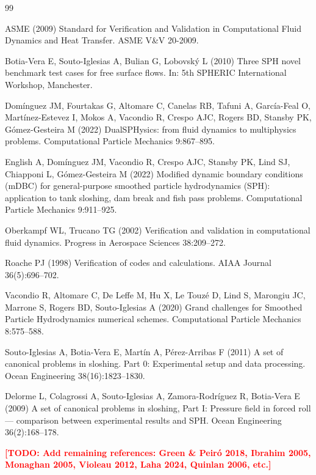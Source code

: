 \documentclass[twocolumn]{svjour3}
\newcommand{\TODO}[1]{\textcolor{red}{\textbf{[TODO: #1]}}}
\begin{document}
\begin{thebibliography}{99}

ASME (2009)
Standard for Verification and Validation in Computational Fluid Dynamics
and Heat Transfer.
ASME V\&V 20-2009.

Botia-Vera E, Souto-Iglesias A, Bulian G, Lobovsk\'y L (2010)
Three SPH novel benchmark test cases for free surface flows.
In: 5th SPHERIC International Workshop, Manchester.

Dom\'inguez JM, Fourtakas G, Altomare C, Canelas RB, Tafuni A, Garc\'ia-Feal O,
Mart\'inez-Estevez I, Mokos A, Vacondio R, Crespo AJC, Rogers BD,
Stansby PK, G\'omez-Gesteira M (2022)
DualSPHysics: from fluid dynamics to multiphysics problems.
Computational Particle Mechanics 9:867--895.

English A, Dom\'inguez JM, Vacondio R, Crespo AJC, Stansby PK, Lind SJ,
Chiapponi L, G\'omez-Gesteira M (2022)
Modified dynamic boundary conditions (mDBC) for general-purpose smoothed
particle hydrodynamics (SPH): application to tank sloshing, dam break
and fish pass problems.
Computational Particle Mechanics 9:911--925.

Oberkampf WL, Trucano TG (2002)
Verification and validation in computational fluid dynamics.
Progress in Aerospace Sciences 38:209--272.

Roache PJ (1998)
Verification of codes and calculations.
AIAA Journal 36(5):696--702.

Vacondio R, Altomare C, De Leffe M, Hu X, Le Touz\'e D, Lind S,
Marongiu JC, Marrone S, Rogers BD, Souto-Iglesias A (2020)
Grand challenges for Smoothed Particle Hydrodynamics numerical schemes.
Computational Particle Mechanics 8:575--588.

Souto-Iglesias A, Botia-Vera E, Mart\'in A, P\'erez-Arribas F (2011)
A set of canonical problems in sloshing. Part 0: Experimental setup
and data processing.
Ocean Engineering 38(16):1823--1830.

Delorme L, Colagrossi A, Souto-Iglesias A, Zamora-Rodr\'iguez R,
Botia-Vera E (2009)
A set of canonical problems in sloshing, Part I: Pressure field in
forced roll --- comparison between experimental results and SPH.
Ocean Engineering 36(2):168--178.

\TODO{Add remaining references: Green \& Peir\'o 2018, Ibrahim 2005,
Monaghan 2005, Violeau 2012, Laha 2024, Quinlan 2006, etc.}

\end{thebibliography}
\end{document}
